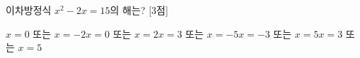 이차방정식 $x^2-2x=15$의 해는? \mbox{[3점]}
\begin{choicesii}{$x=0$ 또는 $x=-2$}{$x=0$ 또는 $x=2$}{$x=3$ 또는 $x=-5$}{$x=-3$ 또는 $x=5$}{$x=3$ 또는 $x=5$}\end{choicesii}
